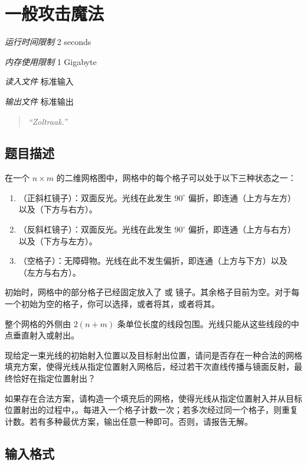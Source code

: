 \section[H. 一般攻击魔法]{ 一般攻击魔法}

\textit{运行时间限制}   2 seconds

\textit{内存使用限制} 1 Gigabyte

\textit{读入文件} \qquad 标准输入

\textit{输出文件} \qquad 标准输出


\begin{quote}
	\textit{``Zoltraak.''}
\end{quote}

\subsection{题目描述}

在一个 $n \times m$ 的二维网格图中，网格中的每个格子可以处于以下三种状态之一：

\begin{enumerate}
	\item \TT{/}（正斜杠镜子）：双面反光。光线在此发生 $90^\circ$ 偏折，即连通（上方与左方）以及（下方与右方）。
	\item \TT{\textbackslash}（反斜杠镜子）：双面反光。光线在此发生 $90^\circ$ 偏折，即连通（上方与右方）以及（下方与左方）。
	\item {}（空格子）：无障碍物。光线在此不发生偏折，即连通（上方与下方）以及（左方与右方）。
\end{enumerate}

初始时，网格中的部分格子已经固定放入了 \TT{/} 或 \TT{\textbackslash} 镜子。其余格子目前为空。对于每一个初始为空的格子，你可以选择，或者将其，或者将其。

整个网格的外侧由 $2(n+m)$ 条单位长度的线段包围。光线只能从这些线段的中点垂直射入或射出。

现给定一束光线的初始射入位置以及目标射出位置，请问是否存在一种合法的网格填充方案，使得光线从指定位置射入网格后，经过若干次直线传播与镜面反射，最终恰好在指定位置射出？

如果存在合法方案，请构造一个填充后的网格，使得光线从指定位置射入并从目标位置射出的过程中，。每进入一个格子计数一次；若多次经过同一个格子，则重复计数。若有多种最优方案，输出任意一种即可。否则，请报告无解。

\subsection{输入格式}

